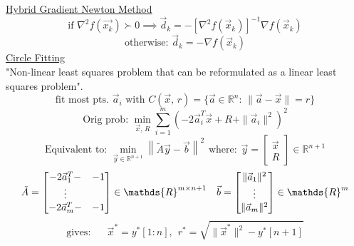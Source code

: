 \documentclass[twocolumn,12pt]{article}    %
\begin{document}
\noindent\underline{Hybrid Gradient Newton Method}
\begin{equation*}
    \text{if } \nabla^2 f(\vec{x_k}) \succ 0\implies \vec{d}_k = - [\nabla^2 f(\vec{x}_k)]^{-1} \nabla f( \vec{x}_k)
\end{equation*}
\begin{equation*}
    \text{otherwise: } \vec{d}_k = -\nabla f(\vec{x}_k)
\end{equation*}
\noindent \underline{Circle Fitting}\\
"Non-linear least squares problem that can be reformulated as a linear least squares problem".
\begin{equation*}
    \text{fit most pts. } \vec{a}_i \text{ with } C(\vec{x},\, r) = \{\vec{a} \in\mathds{R}^n:\, \|\vec{a} - \vec{x}\| = r\}
\end{equation*}
\begin{equation*}
    \text{Orig prob:     } \min_{\vec{x},\, R}  \sum_{i=1}^m\left(-2\vec{a}_i^T\vec{x} + R + \|\vec{a}_i\|^2 \right)^2
\end{equation*}
\begin{equation*}
    \text{Equivalent to:    }\min_{\vec{y} \in\mathds{R}^{n+1}} \left\|\tilde{A} \vec{y} - \vec{b} \right\|^2 \hspace{5pt} \text{where:} \hspace{5pt} \vec{y} = \begin{bmatrix}
        \vec{x} \\R 
    \end{bmatrix} \in \mathds{R}^{n+1}
\end{equation*}
\begin{equation*}
    \tilde{A} = \begin{bmatrix}
        \--  2\vec{a}_1^T  \-- & -1 \\
          \vdots  &\\
         \--  2\vec{a}_m^T  \-- & -1 \\
    \end{bmatrix} \in \mathds{R}^{m\times n+1} \hspace{10pt} \Vec{b} = \begin{bmatrix}
        \|\vec{a}_1\|^2 \\ \vdots \\\|\vec{a}_m\|^2
    \end{bmatrix} \in \mathds{R}^m
\end{equation*}
\begin{equation*}
    \text{gives:} \hspace{20pt} \vec{x}^* = y^*[1:n], \hspace{5pt} r^* = \sqrt{\|\vec{x}^*\|^2 - y^*[n+1]}
\end{equation*}
\end{document}
